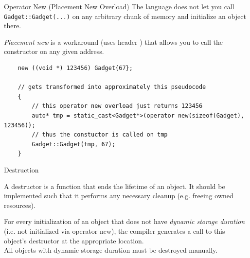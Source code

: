\begin{frame}[fragile]{Operator New (Placement New Overload)}
  The language does not let you call \texttt{Gadget::Gadget(...)} on any 
  arbitrary chunk of memory and initialize an object there.
  
  \begin{sqt:definition}
    \emph{Placement new} is a workaround (uses header ) that allows
    you to call the constructor on any given address.
  \end{sqt:definition}

  \begin{verbatim}
    new ((void *) 123456) Gadget{67};

    // gets transformed into approximately this pseudocode
    {
        // this operator new overload just returns 123456
        auto* tmp = static_cast<Gadget*>(operator new(sizeof(Gadget), 123456));
        // thus the constuctor is called on tmp
        Gadget::Gadget(tmp, 67);
    }
  \end{verbatim}
\end{frame}

\begin{frame}[fragile]{Destruction}
  \begin{sqt:definition}
    A destructor is a function that ends the lifetime of an object.
    It should be implemented such that it performs any necessary cleanup (e.g. freeing owned resources).
  \end{sqt:definition}

  \begin{sqt:result}
    For every initialization of an object that does not have \emph{dynamic storage duration} (i.e. not initialized via operator new),
    the compiler generates a call to this object's destructor at the appropriate location.\\
    All objects with dynamic storage duration must be destroyed manually.
  \end{sqt:result}
\end{frame}

